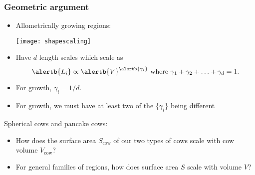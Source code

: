 \begin{frame}
  \frametitle{Geometric argument}

  \begin{block}{}
  \begin{itemize}
  \item<1-> Allometrically growing regions:
  \begin{center}
    \texttt{[image: shapescaling]}    
  \end{center}
  \bigskip
  \item<1-> Have $d$ length scales which scale
    as 
    {
      $$
      \alertb{L_i} \propto \alertb{V}^{\alertb{\gamma_i}}
      \mbox{\ where $\gamma_1 + \gamma_2 + \ldots + \gamma_d = 1$.}
      $$
    }
  \item<1-> 
    For  growth, $\gamma_i = 1/d$.
  \item<1->
    For  growth, 
    we must have at least two of the $\{\gamma_i\}$ being different
  \end{itemize}
  \end{block}

\end{frame}

\begin{frame}

  \begin{block}{Spherical cows and pancake cows:}

    \begin{itemize}
    \item<+-> 
      How does the surface area $S_{\textrm{cow}}$ of our two types
      of cows scale with cow volume $V_{\textrm{cow}}$?
    \item<+-> 
      For general families of regions,
      how does surface area $S$ scale with 
      volume $V$?
    \end{itemize}
  \end{block}

\end{frame}


